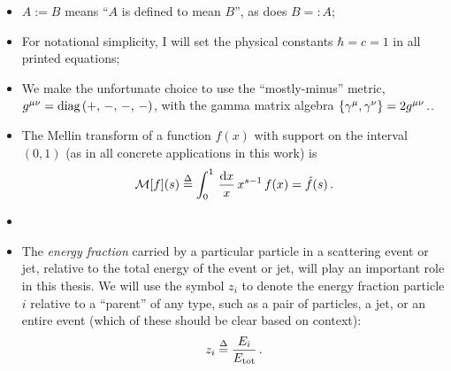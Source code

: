 \begin{itemize}
    \item
        \(A := B\) means ``\(A\) is defined to mean \(B\)'', as does \(B =: A\);

    \item
        For notational simplicity, I will set the physical constants \(\hbar = c = 1\) in all printed equations;

    \item
        We make the unfortunate choice to use the ``mostly-minus'' metric, \(g^{\mu\nu} = \text{diag}\left(+,\,-,\,-,\,-\right)\), with the gamma matrix algebra \(\acomm{\gamma^\mu}{\gamma^\nu} = 2 g^{\mu\nu}\,.\).

    \item
        The Mellin transform of a function \(f(x)\) with support on the interval \((0,1)\) (as in all concrete applications in this work) is
        \begin{align}
            \mathcal{M}[f](s)
            \overset{\Delta}{=}
            \int_0^1 \,\frac{\dd x}{x}\, x^{s-1} \, f(x)
            =
            \hat f(s)
            \,.
        \end{align}

    \item

    \item
        The \textit{energy fraction} carried by a particular particle in a scattering event or jet, relative to the total energy of the event or jet, will play an important role in this thesis.
        We will use the symbol \(z_i\) to denote the energy fraction particle \(i\) relative to a ``parent'' of any type, such as a pair of particles, a jet, or an entire event (which of these should be clear based on context):
        \begin{align}
            z_i
            \overset{\Delta}{=}
            \frac{E_i}{E_\text{tot}}
            \,.
        \end{align}


\end{itemize}
